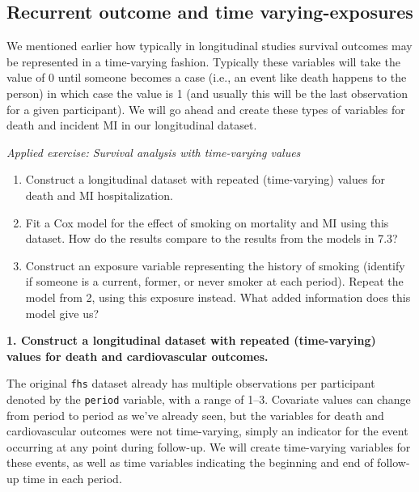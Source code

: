 \documentclass[
]{book}
\providecommand{\tightlist}{%
  \setlength{\itemsep}{0pt}\setlength{\parskip}{0pt}}
\begin{document}
\hypertarget{recurrent-outcome-and-time-varying-exposures}{%
\subsection{Recurrent outcome and time varying-exposures}\label{recurrent-outcome-and-time-varying-exposures}}

We mentioned earlier how typically in longitudinal studies survival outcomes may be represented in a time-varying fashion. Typically these variables will take the value of 0 until someone becomes a case (i.e., an event like death happens to the person) in which case the value is 1 (and usually this will be the last observation for a given participant). We will go ahead and create these types of variables for death and incident MI in our longitudinal dataset.

\emph{Applied exercise: Survival analysis with time-varying values}

\begin{enumerate}
\def\labelenumi{\arabic{enumi}.}
\tightlist
\item
  Construct a longitudinal dataset with repeated (time-varying) values for death and MI hospitalization.
\item
  Fit a Cox model for the effect of smoking on mortality and MI using this dataset. How do the results compare to the results from the models in 7.3?
\item
  Construct an exposure variable representing the history of smoking (identify if someone is a current, former, or never smoker at each period). Repeat the model from 2, using this exposure instead. What added information does this model give us?
\end{enumerate}

\textbf{1. Construct a longitudinal dataset with repeated (time-varying) values for death and cardiovascular outcomes.}

The original \texttt{fhs} dataset already has multiple observations per participant denoted by the \texttt{period} variable, with a range of 1--3. Covariate values can change from period to period as we've already seen, but the variables for death and cardiovascular outcomes were not time-varying, simply an indicator for the event occurring at any point during follow-up. We will create time-varying variables for these events, as well as time variables indicating the beginning and end of follow-up time in each period.
\end{document}
